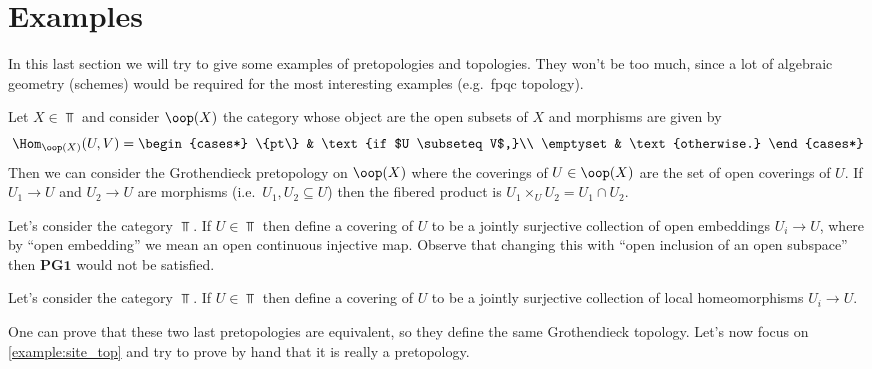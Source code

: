 \documentclass[a4paper]{article}
\begin{document}
    \section{Examples}
         In this last section we will try to give some examples of pretopologies and topologies. They won't be too much, since a lot of algebraic geometry (schemes) would be required for the most interesting examples (e.g.\ fpqc topology).
         \begin{example}
            \label{example:site_top}
             Let $X \in \Top$ and consider $\oop(X)$ the category whose object are the open subsets of $X$ and morphisms are given by \[\Hom_{\oop(X)}(U, V) = \begin{cases*}
                 \{pt\} & \text{if $U \subseteq V$,}\\
                 \emptyset & \text{otherwise.}
             \end{cases*} \] Then we can consider the Grothendieck pretopology on $\oop(X)$ where the coverings of $U \in \oop(X)$ are the set of open coverings of $U$. If $U_1 \to U$ and $U_2 \to U$ are morphisms (i.e.\ $U_1, U_2 \subseteq U$) then the fibered product is $U_1 \times_U U_2 = U_1 \cap U_2$.
         \end{example}
         \begin{example}
             Let's consider the category $\Top$. If $U \in \Top$ then define a covering of $U$ to be a jointly surjective collection of open embeddings $U_i \to U$, where by ``open embedding'' we mean an open continuous injective map.
             Observe that changing this with ``open inclusion of an open subspace'' then $\mathbf{PG1}$ would not be satisfied.
         \end{example}
         \begin{example}
             Let's consider the category $\Top$. If $U \in \Top$ then define a covering of $U$ to be a jointly surjective collection of local homeomorphisms $U_i \to U$.
         \end{example}
         One can prove that these two last pretopologies are equivalent, so they define the same Grothendieck topology.
         Let's now focus on \cref{example:site_top} and try to prove by hand that it is really a pretopology.
\end{document}
